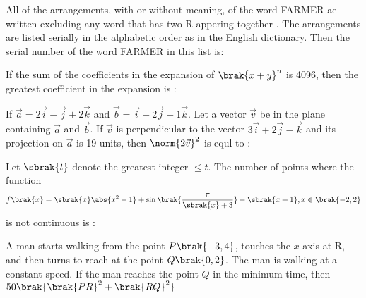     \item All of the arrangements, with or without meaning, of the word FARMER ae written excluding any word that has two R appering together . The arrangements
        are listed serially in the alphabetic order as in the English dictionary. Then the serial number of the word FARMER in this list is:
        \hfill{}\\


    \item If the sum of the coefficients in the expansion of $\brak{x + y}^n$ is 4096, then the greatest coefficient in the expansion is :
        \hfill{}\\


    \item If $\vec{a} = 2\vec{i} - \vec{j} + 2\vec{k}$ and $\vec{b} = \vec{i} + 2\vec{j} - 1\vec{k}$. Let a vector $\vec{v}$ be in the plane containing
        $\vec{a}$ and $\vec{b}$. If $\vec{v}$ is perpendicular to the vector $3\vec{i} + 2\vec{j} - \vec{k}$ and its projection on $\vec{a}$ is 19 units, 
        then $\norm{2\vec{v}}^2$ is equl to :
        \hfill{}\\


    \item Let $\sbrak{t}$ denote the greatest integer $ \le t $. The number of points where the function
        \begin{align}
            f\brak{x} = \sbrak{x} \abs{x^2 - 1} + \sin \brak{\frac{\pi}{\sbrak{x} + 3}} - \sbrak{x + 1}, x \in \brak{-2, 2} 
        \end{align}
        is not continuous is :
        \hfill{}\\


    \item A man starts walking from the point $P\brak{-3,4}$, touches the $x$-axis at R, and then turns to reach at the point $Q\brak{0, 2}$. The man is walking at a constant
        speed. If the man reaches the point $Q$ in the minimum time, then $50\brak{\brak{PR}^2 + \brak{RQ}^2}$
        \hfill{}
            \begin{center}
            \end{center}
